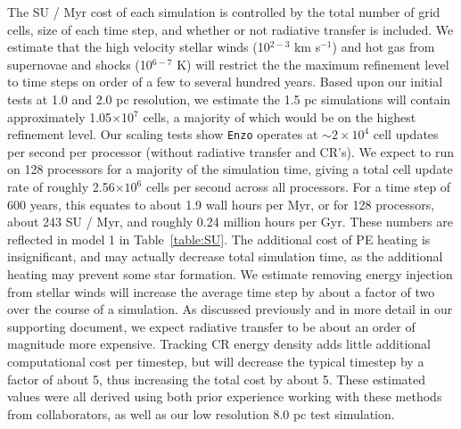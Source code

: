 \documentclass[11pt]{article}
\begin{document}
The SU / Myr cost of each simulation is controlled by the total number of grid cells, size of each time step, and whether or not radiative transfer is included. We estimate that the high velocity stellar winds (10$^{2-3}$ km s$^{-1}$) and hot gas from supernovae and shocks (10$^{6-7}$ K) will restrict the the maximum refinement level to time steps on order of a few to several hundred years. Based upon our initial tests at 1.0 and 2.0 pc resolution, we estimate the 1.5 pc simulations will contain approximately 1.05$\times$10$^{7}$ cells, a majority of which would be on the highest refinement level. Our scaling tests show \texttt{Enzo} operates at $\sim 2\times10^{4}$ cell updates per second per processor (without radiative transfer and CR's). We expect to run on 128 processors for a majority of the simulation time, giving a total cell update rate of roughly 2.56$\times 10^{6}$ cells per second across all processors. For a time step of 600 years, this equates to about 1.9 wall hours per Myr, or for 128 processors, about 243 SU / Myr, and roughly 0.24 million hours per Gyr. These numbers are reflected in model 1 in Table~\ref{table:SU}. The additional cost of PE heating is insignificant, and may actually decrease total simulation time, as the additional heating may prevent some star formation. We estimate removing energy injection from stellar winds will increase the average time step by about a factor of two over the course of a simulation. As discussed previously and in more detail in our supporting document, we expect radiative transfer to be about an order of magnitude more expensive. Tracking CR energy density adds little additional computational cost per timestep, but will decrease the typical timestep by a factor of about 5, thus increasing the total cost by about 5. These estimated values were all derived using both prior experience working with these methods from collaborators, as well as our low resolution 8.0 pc test simulation.
\end{document}
